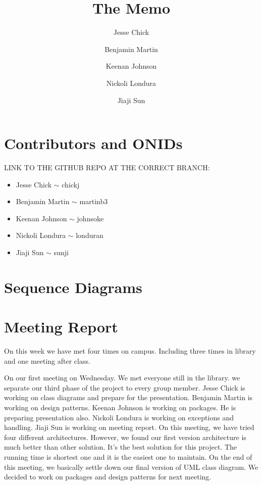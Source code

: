 \documentclass[12pt]{article}
\title{The Memo}
\author{Jesse Chick\\
\and Benjamin Martin\\
\and Keenan Johnson\\
\and Nickoli Londura\\
\and Jiaji Sun}
\begin{document}
\maketitle
\tableofcontents

\section{Contributors and ONIDs}
\par
LINK TO THE GITHUB REPO AT THE CORRECT BRANCH: 

\begin{itemize}
	\item Jesse Chick $\sim$ chickj
	\item Benjamin Martin $\sim$ martinb3
	\item Keenan Johnson $\sim$ johnsoke
	\item Nickoli Londura $\sim$ londuran
	\item Jiaji Sun $\sim$ sunji
\end{itemize}

\section{}

\section{}


\section{Sequence Diagrams}


\section{Meeting Report}
\par
On this week we have met four times on campus. Including three times in library and one meeting after class. \\

\par
On our first meeting on Wednesday. We met everyone still in the library. we separate our third phase of the project to every group member. Jesse Chick is working on class diagrams and prepare for the presentation. Benjamin Martin is working on design patterns. Keenan Johnson is working on packages. He is preparing presentation also. Nickoli Londura is working on exceptions and handling. Jiaji Sun is working on meeting report. On this meeting, we have tried four different architectures. However, we found our first version architecture is much better than other solution. It’s the best solution for this project. The running time is shortest one and it is the easiest one to maintain. On the end of this meeting, we basically settle down our final version of UML class diagram. We decided to work on packages and design patterns for next meeting. \\


\cite{rubtut}



\end{document}
